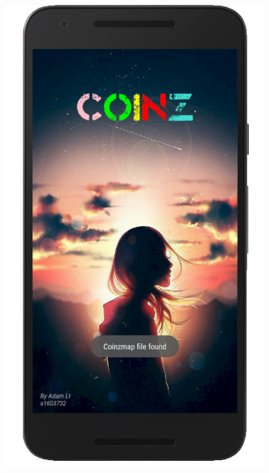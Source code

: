 \documentclass[12pt]{article}
\begin{document}
\begin{figure}
	\includegraphics[scale=0.25]{SplashActivityFileFound.png}

\end{figure}
\end{document}
